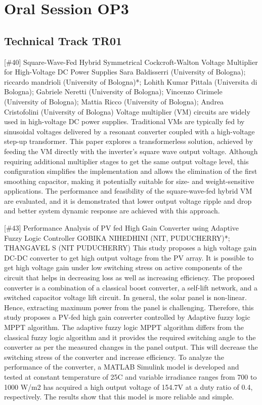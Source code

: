 \clearpage\section{Oral Session OP3}\nopagebreak \subsection{Technical Track TR01}\nopagebreak{} \begin{abstract_online} {[\#40] Square-Wave-Fed Hybrid Symmetrical Cockcroft-Walton Voltage Multiplier for High-Voltage DC Power Supplies} {} {Sara Baldisserri (University of Bologna); riccardo mandrioli (University of Bologna)*; Lohith Kumar Pittala (Universita di Bologna); Gabriele Neretti (University of Bologna); Vincenzo Cirimele (University of Bologna); Mattia Ricco (University of Bologna); Andrea Cristofolini (University of Bologna)} {} Voltage multiplier (VM) circuits are widely used in high-voltage DC power supplies. Traditional VMs are typically fed by sinusoidal voltages delivered by a resonant converter coupled with a high-voltage step-up transformer. This paper explores a transformerless solution, achieved by feeding the VM directly with the inverter's square wave output voltage. Although requiring additional multiplier stages to get the same output voltage level, this configuration simplifies the implementation and allows the elimination of the first smoothing capacitor, making it potentially suitable for size- and weight-sensitive applications. The performance and feasibility of the square-wave-fed hybrid VM are evaluated, and it is demonstrated that lower output voltage ripple and drop and better system dynamic response are achieved with this approach. \end{abstract_online} 
{} \begin{abstract_online} {[\#43] Performance Analysis of PV fed High Gain Converter using Adaptive Fuzzy Logic Controller } {} {GOBIKA NIHEDHINI (NIT, PUDUCHERRY)*; THANGAVEL S (NIT PUDUCHERRY)} {} This study proposes a high voltage gain DC-DC converter to get high output voltage from the PV array. It is possible to get high voltage gain under low switching stress on active components of the circuit that helps in decreasing loss as well as increasing efficiency. The proposed converter is a combination of a classical boost converter, a self-lift network, and a switched capacitor voltage lift circuit. In general, the solar panel is non-linear. Hence, extracting maximum power from the panel is challenging. Therefore, this study proposes a PV-fed high gain converter controlled by Adaptive fuzzy logic MPPT algorithm. The adaptive fuzzy logic MPPT algorithm differs from the classical fuzzy logic algorithm and it provides the required switching angle to the converter as per the measured changes in the panel output. This will decrease the switching stress of the converter and increase efficiency. To analyze the performance of the converter, a MATLAB Simulink model is developed and tested at constant temperature of 25C and variable irradiance ranges from 700 to 1000 W/m2 has acquired a high output voltage of 154.7V at a duty ratio of 0.4, respectively. The results show that this model is more reliable and simple.  \end{abstract_online} 
